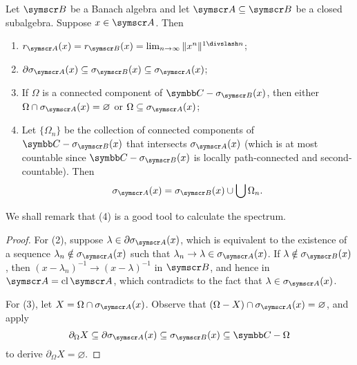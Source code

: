 \begin{proposition}
  Let $\BA B$ be a Banach algebra and let $\BA A\subseteq \BA B$ be a closed subalgebra. Suppose $x\in\BA A$. Then
  \begin{enumerate}
    \item $r_{\BA A}(x) = r_{\BA B}(x) = \lim_{n\to\infty}\NORM{x^n}^{1\DIV n}$;
    \item $\partial\sigma_{\BA A}(x)\subseteq\sigma_{\BA B}(x)\subseteq \sigma_{\BA A}(x)$;
    \item If $\Omega$ is a connected component of $\CC - \sigma_{\BA B}(x)$, then either $\Omega\cap \sigma_{\BA A}(x)=\varnothing$ or $\Omega\subseteq \sigma_{\BA A}(x)$;
    \item Let $\{\Omega_n\}$ be the collection of connected components of $\CC - \sigma_{\BA B}(x)$ that intersects $\sigma_{\BA A}(x)$ (which is at most countable since $\CC - \sigma_{\BA B}(x)$ is locally path-connected and second-countable). Then
    \begin{equation}
      \sigma_{\BA A}(x)=\sigma_{\BA B}(x)\cup\bigcup \Omega_n.
    \end{equation}
  \end{enumerate}
\end{proposition}

We shall remark that (4) is a good tool to calculate the spectrum.

\begin{proof}
  For (2), suppose $\lambda\in\partial\sigma_{\BA A}(x)$, which is equivalent to the existence of a sequence $\lambda_n\notin \sigma_{\BA A}(x)$ such that $\lambda_n\to \lambda\in \sigma_{\BA A}(x)$. If $\lambda\notin \sigma_{\BA B}(x)$, then $(x-\lambda_n)^{-1}\to (x-\lambda)^{-1}$ in $\BA B$, and hence in $\BA A = \CL \BA A$, which contradicts to the fact that $\lambda\in\sigma_{\BA A}(x)$.

  For (3), let $X = \Omega\cap \sigma_{\BA A}(x)$. Observe that $(\Omega-X)\cap \sigma_{\BA A}(x)=\varnothing$, and apply
  \begin{equation*}
    \partial_\Omega X\subseteq\partial\sigma_{\BA A}(x)\subseteq\sigma_{\BA B}(x)\subseteq \CC-\Omega
  \end{equation*}
  to derive $\partial_\Omega X = \varnothing$.
\end{proof}

